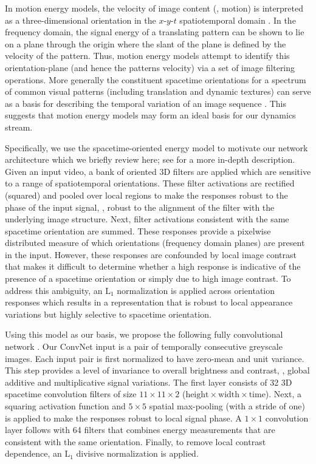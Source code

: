 In motion energy models, the velocity of image content (\ie, motion)
is interpreted as a three-dimensional orientation in the $x$-$y$-$t$
spatiotemporal domain
\cite{adelson1985spatiotemporal,fahle1981,heeger1988,simoncelli1998,watson1983}.
In the frequency domain, the signal energy of a translating
pattern can be shown to lie on a plane through the origin
where the slant of the plane is defined by the velocity of
the  pattern.
Thus, motion energy models attempt to identify this 
orientation-plane (and hence the patterns velocity) via
a set of image filtering operations.
More generally
the constituent
spacetime orientations for a spectrum of common
visual patterns (including translation and dynamic
textures) can serve as a basis for describing the temporal
variation of an image sequence \cite{derpanis2012spacetime}.
This suggests that motion energy models may form an
ideal basis for our dynamics stream.

Specifically, we use the spacetime-oriented energy model
\cite{derpanis2012spacetime,simoncelli1998} to motivate our
network architecture which we briefly review here; 
see \cite{derpanis2012spacetime} for a more in-depth 
description.
Given an input video, 
a bank of oriented 3D
filters are applied which are sensitive to a range of
spatiotemporal orientations.
These filter activations are rectified (squared) and
pooled over local regions to make the responses robust
to the phase of the input signal, \ie, robust to the
alignment of the filter with the underlying image
structure.
Next, filter activations consistent with the same spacetime
orientation are summed.
These responses provide a pixelwise distributed measure
of which orientations (frequency domain planes) are
present in the input.
However, these responses are confounded by local image
contrast that makes 
it difficult to determine
whether a high response is indicative of the presence of
a spacetime orientation or simply due to high image
contrast.
To address this ambiguity, an $\textrm{L}_1$
normalization is applied across orientation responses which
results in a representation that is robust to local
appearance variations but highly selective to 
spacetime orientation.

Using this model as our basis, we propose the following 
fully convolutional 
network
\cite{shelhamer2017}.
Our ConvNet input is a pair of temporally consecutive greyscale images.
Each input pair is first normalized to have zero-mean and unit
variance.
This step provides a level of invariance to overall
brightness and contrast, \ie, global additive and
multiplicative signal variations.
The first layer consists of 32 3D spacetime convolution
filters of size $11\times 11 \times 2$
($\text{height} \times \text{width} \times \text{time}$).
Next, a squaring activation function and $5 \times 5$
spatial max-pooling (with a stride of one) is applied to
make the responses robust to local signal phase.
A $1\times 1$
convolution layer follows with 64 filters that combines
energy measurements that are consistent
with the same orientation.
Finally, to remove local contrast dependence, an
$\text{L}_1$ divisive normalization is applied.

